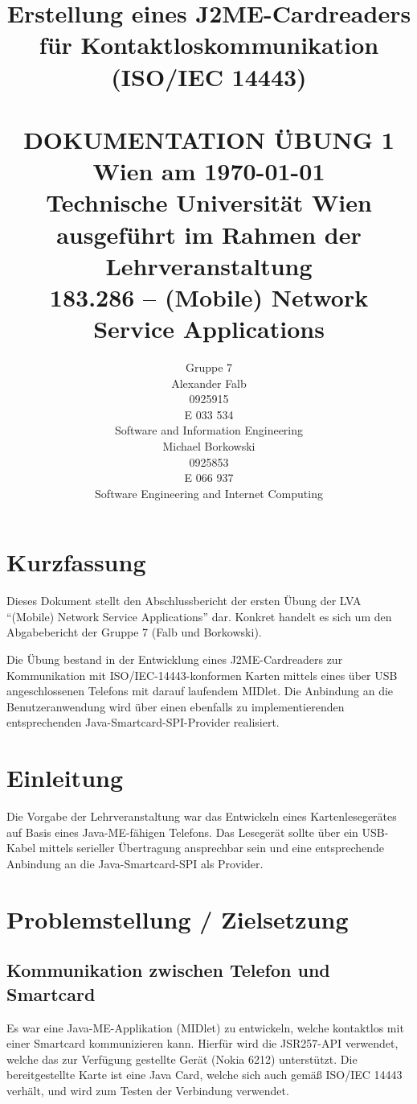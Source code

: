 \documentclass[paper=a4, fontsize=11pt]{scrartcl}
\title{	\normalsize Erstellung eines J2ME-Cardreaders für Kontaktloskommunikation (ISO/IEC 14443)%
	\\[2.0cm] \HRule{0.5pt} \\
	\LARGE \textbf{\uppercase{Dokumentation Übung 1}} %
	\HRule{2pt} \\[1.5cm]
	\normalsize Wien am \today \\
	\normalsize Technische Universität Wien \\[1.0cm]
	\normalsize ausgeführt im Rahmen der Lehrveranstaltung \\
	\LARGE 183.286 – (Mobile) Network Service Applications
}
\author{
	Gruppe 7 \\[2.0cm]
	Alexander Falb \\
	0925915 \\
	E 033 534 \\
	Software and Information Engineering \\[2.0cm]
	Michael Borkowski \\
	0925853 \\
	E 066 937 \\
	Software Engineering and Internet Computing \\[2.0cm]
}
\makeatletter
\def\printtitle{%
	{\centering \@title\par}}
\def\printauthor{%
	{\centering \normalsize \@author}}
\makeatother
\begin{document}
\thispagestyle{empty} %
\printtitle
	\vfill
\printauthor

\newpage
\tableofcontents

\newpage
\section{Kurzfassung}
Dieses Dokument stellt den Abschlussbericht der ersten Übung der LVA \enquote{(Mobile) Network Service Applications} dar. Konkret handelt es sich um den Abgabebericht der Gruppe 7 (Falb und Borkowski).

Die Übung bestand in der Entwicklung eines J2ME-Cardreaders zur Kommunikation mit ISO/IEC-14443-konformen Karten mittels eines über USB angeschlossenen Telefons mit darauf laufendem MIDlet. Die Anbindung an die Benutzeranwendung wird über einen ebenfalls zu implementierenden entsprechenden Java-Smartcard-SPI-Provider realisiert.


\section{Einleitung}
Die Vorgabe der Lehrveranstaltung war das Entwickeln eines Kartenlesegerätes auf Basis eines Java-ME-fähigen Telefons. Das Lesegerät sollte über ein USB-Kabel mittels serieller Übertragung ansprechbar sein und eine entsprechende Anbindung an die Java-Smartcard-SPI als Provider.


\section{Problemstellung / Zielsetzung}
\subsection{Kommunikation zwischen Telefon und Smartcard}
Es war eine Java-ME-Applikation (MIDlet) zu entwickeln, welche kontaktlos mit einer Smartcard kommunizieren kann. Hierfür wird die JSR257-API verwendet, welche das zur Verfügung gestellte Gerät (Nokia 6212) unterstützt. Die bereitgestellte Karte ist eine Java Card, welche sich auch gemäß ISO/IEC 14443 verhält, und wird zum Testen der Verbindung verwendet.
\end{document}
